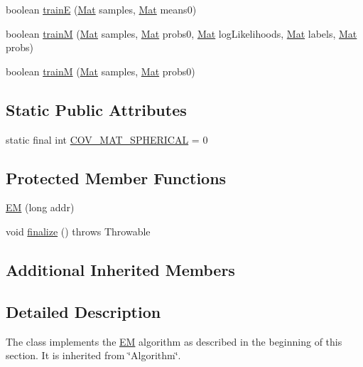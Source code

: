 \begin{DoxyCompactItemize}
\item 
boolean \mbox{\hyperlink{classorg_1_1opencv_1_1ml_1_1_e_m_afdfad3d3fa2f0074352f6e32058fac7e}{trainE}} (\mbox{\hyperlink{classorg_1_1opencv_1_1core_1_1_mat}{Mat}} samples, \mbox{\hyperlink{classorg_1_1opencv_1_1core_1_1_mat}{Mat}} means0)
\item 
boolean \mbox{\hyperlink{classorg_1_1opencv_1_1ml_1_1_e_m_a242fe35e37b4b1888ccab72ff8d959d0}{trainM}} (\mbox{\hyperlink{classorg_1_1opencv_1_1core_1_1_mat}{Mat}} samples, \mbox{\hyperlink{classorg_1_1opencv_1_1core_1_1_mat}{Mat}} probs0, \mbox{\hyperlink{classorg_1_1opencv_1_1core_1_1_mat}{Mat}} log\+Likelihoods, \mbox{\hyperlink{classorg_1_1opencv_1_1core_1_1_mat}{Mat}} labels, \mbox{\hyperlink{classorg_1_1opencv_1_1core_1_1_mat}{Mat}} probs)
\item 
boolean \mbox{\hyperlink{classorg_1_1opencv_1_1ml_1_1_e_m_a033388662534cca4206a833e8f14e8f8}{trainM}} (\mbox{\hyperlink{classorg_1_1opencv_1_1core_1_1_mat}{Mat}} samples, \mbox{\hyperlink{classorg_1_1opencv_1_1core_1_1_mat}{Mat}} probs0)
\end{DoxyCompactItemize}
\subsection*{Static Public Attributes}
\begin{DoxyCompactItemize}
\item 
static final int \mbox{\hyperlink{classorg_1_1opencv_1_1ml_1_1_e_m_a2e74f419371b3c7e84535edc80fb66ff}{C\+O\+V\+\_\+\+M\+A\+T\+\_\+\+S\+P\+H\+E\+R\+I\+C\+AL}} = 0
\end{DoxyCompactItemize}
\subsection*{Protected Member Functions}
\begin{DoxyCompactItemize}
\item 
\mbox{\hyperlink{classorg_1_1opencv_1_1ml_1_1_e_m_afc05e1235750dcbfeab4f2bd81169de5}{EM}} (long addr)
\item 
void \mbox{\hyperlink{classorg_1_1opencv_1_1ml_1_1_e_m_a0920161a9a241962ea606e0aa7098c10}{finalize}} ()  throws Throwable 
\end{DoxyCompactItemize}
\subsection*{Additional Inherited Members}


\subsection{Detailed Description}
The class implements the \mbox{\hyperlink{classorg_1_1opencv_1_1ml_1_1_e_m}{EM}} algorithm as described in the beginning of this section. It is inherited from \char`\"{}\+Algorithm\char`\"{}.

